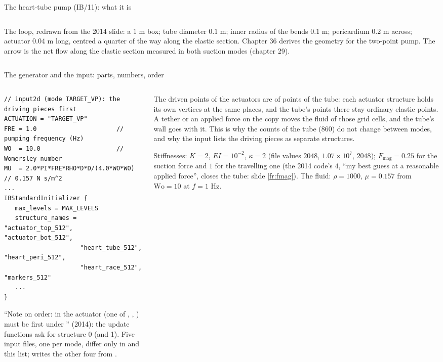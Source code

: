 \documentclass[aspectratio=169,11pt]{beamer}
\begin{document}
\begin{frame}{The heart-tube pump (IB/11): what it is}
\begin{columns}[T,onlytextwidth]
\begin{column}{0.48\textwidth}
\scriptsize The loop, redrawn from the 2014 slide: a $1$ m box; tube diameter $0.1$ m; inner radius of the bends $0.1$ m; pericardium $0.2$ m across; actuator $0.04$ m long, centred a quarter of the way along the elastic section. Chapter 36 derives the geometry for the two-point pump. The arrow is the net flow along the elastic section measured in both suction modes (chapter 29).
\end{column}
\end{columns}
\end{frame}

\begin{frame}[fragile]{The generator and the input: parts, numbers, order}
\label{fr:parts}
\vspace{-1mm}
\begin{columns}[T,onlytextwidth]
\begin{column}{0.5\textwidth}
\begin{lstlisting}[style=inputtiny]
// input2d (mode TARGET_VP): the driving pieces first
ACTUATION = "TARGET_VP"
FRE = 1.0                      // pumping frequency (Hz)
WO  = 10.0                     // Womersley number
MU  = 2.0*PI*FRE*RHO*D*D/(4.0*WO*WO)   // 0.157 N s/m^2
...
IBStandardInitializer {
   max_levels = MAX_LEVELS
   structure_names = "actuator_top_512", "actuator_bot_512",
                     "heart_tube_512", "heart_peri_512",
                     "heart_race_512", "markers_512"
   ...
}
\end{lstlisting}
\scriptsize ``Note on order: in  the actuator (one of , , ) must be first under '' (2014): the update functions ask for structure 0 (and 1). Five input files, one per mode, differ only in  and this list;  writes the other four from .
\end{column}
\begin{column}{0.48\textwidth}
\footnotesize The driven points of the actuators are  of points of the tube: each actuator structure holds its own vertices at the same places, and the tube's points there stay ordinary elastic points. A tether or an applied force on the copy moves the fluid of those grid cells, and the tube's wall goes with it. This is why the counts of the tube (860) do not change between modes, and why the input lists the driving pieces as separate structures.
\vspace{1mm}

\footnotesize Stiffnesses: $K = 2$, $EI = 10^{-2}$, $\kappa = 2$ (file values $2048$, $1.07\times10^7$, $2048$); $F_{\mathrm{mag}} = 0.25$ for the suction force and $1$ for the travelling one (the 2014 code's $4$, ``my best guess at a reasonable applied force'', closes the tube: slide \ref{fr:fmag}). The fluid: $\rho = 1000$, $\mu = 0.157$ from $\mathrm{Wo} = 10$ at $f = 1$ Hz.
\end{column}
\end{columns}
\end{frame}
\end{document}
